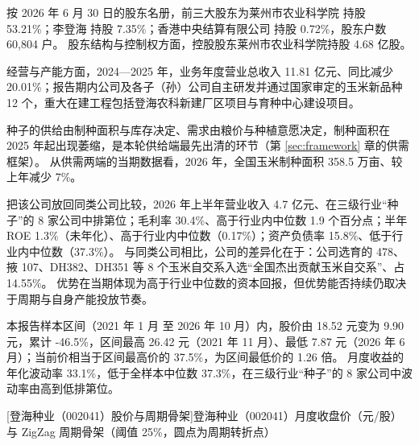  按 2026 年 6 月 30 日的股东名册，前三大股东为莱州市农业科学院 持股 53.21\%；李登海 持股 7.35\%；香港中央结算有限公司 持股 0.72\%，股东户数 60,804 户。 股东结构与控制权方面，控股股东莱州市农业科学院持股 4.68 亿股。

 经营与产能方面，2024---2025 年，业务年度营业总收入 11.81 亿元、同比减少 20.01\%；报告期内公司及各子（孙）公司自主研发并通过国家审定的玉米新品种 12 个，重大在建工程包括登海农科新建厂区项目与育种中心建设项目。

 种子的供给由制种面积与库存决定、需求由粮价与种植意愿决定，制种面积在 2025 年起出现萎缩，是本轮供给端最先出清的环节（第 \ref{sec:framework} 章的供需框架）。 从供需两端的当期数据看，2026 年，全国玉米制种面积 358.5 万亩、较上年减少 7\%。

 把该公司放回同类公司比较，2026 年上半年营业收入 4.7 亿元、在三级行业“种子”的 8 家公司中排第位；毛利率 30.4\%、高于行业内中位数 1.9 个百分点；半年 ROE 1.3\%（未年化）、高于行业内中位数（0.17\%）；资产负债率 15.8\%、低于行业内中位数（37.3\%）。 与同类公司相比，公司的差异化在于：公司选育的 478、掖 107、DH382、DH351 等 8 个玉米自交系入选“全国杰出贡献玉米自交系”、占 14.55\%。 优势在当期体现为高于行业中位数的资本回报，但优势能否持续仍取决于周期与自身产能投放节奏。

 本报告样本区间（2021 年 1 月 至 2026 年 10 月）内，股价由 18.52 元变为 9.90 元，累计 -46.5\%，区间最高 26.42 元（2021 年 11 月）、最低 7.87 元（2026 年 6 月）；当前价相当于区间最高价的 37.5\%，为区间最低价的 1.26 倍。 月度收益的年化波动率 33.1\%，低于全样本中位数 37.3\%，在三级行业“种子”的 8 家公司中波动率由高到低排第位。

\begin{center}
\begin{minipage}{\textwidth}\centering
{}

[登海种业（002041）股价与周期骨架]{登海种业（002041）月度收盘价（元/股）与 ZigZag 周期骨架（阈值 25\%，圆点为周期转折点）}
\end{minipage}
\end{center}

